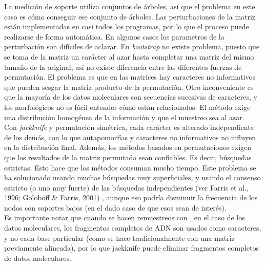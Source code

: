 La medici\'on de soporte utiliza conjuntos de \'arboles, as\'i que el problema en este caso es c\'omo conseguir ese conjunto de \'arboles. Las perturbaciones de la matriz est\'an implementadas en casi todos los programas, por lo que el proceso puede realizarse de forma autom\'atica. En algunos casos los parametros de la perturbaci\'on son dif\'iciles de aclarar. En \textit{bootstrap} no existe problema, puesto que se toma de la matriz un car\'acter al azar hasta completar una matriz del mismo tama\~no de la original, as\'i no existe diferencia entre las diferentes fuerzas de permutaci\'on. El problema es que en las matrices hay caracteres no informativos que pueden sesgar la matriz producto de la permutaci\'on. Otro inconveniente es que la mayor\'ia de los datos moleculares son secuencias sucesivas de caracteres, y los morfol\'ogicos no es f\'acil entender c\'omo est\'an relacionados. El m\'etodo exige una distribuci\'on homog\'enea de la informaci\'on y que el muestreo sea al azar.\\
Con \textit{jackknife} y permutaci\'on sim\'etrica, cada car\'acter es alterado independiente de los dem\'as, con lo que autapomorf\'ias y caracteres no informativos no influyen en la distribuci\'on final. Adem\'as, los m\'etodos basados en permutaciones exigen que los resultados de la matriz permutada sean confiables. Es decir, b\'usquedas estrictas. Esto hace que los m\'etodos consuman mucho tiempo. Este problema se ha solucionado usando muchas b\'usquedas muy superficiales, y usando el consenso estricto (o uno muy fuerte) de las b\'usquedas independientes (ver Farris et al., 1996; Goloboff \& Farris, 2001) \cite{Farris1996} \cite{Goloboff2001}, aunque eso podr\'ia disminuir la frecuencia de los nodos con soportes bajos (en el dado caso de que esos sean de inter\'es).\\
Es importante notar que cuando se hacen remuestreos con , en el caso de los datos moleculares, los fragmentos completos de ADN son usados como caracteres, y no cada base particular (como se hace tradicionalmente con una matriz previamente alineada), por lo que jackknife puede eliminar fragmentos completos de datos moleculares.\\
